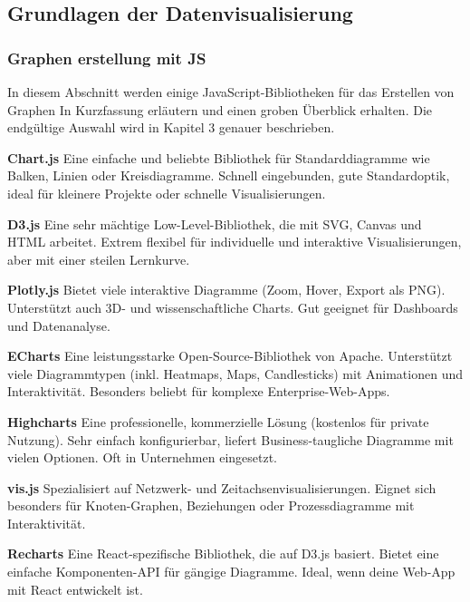 \subsection{Grundlagen der Datenvisualisierung}
\label{subsec:grundlagen-der-datenvisualisierung}

\subsubsection{Graphen erstellung mit JS}
In diesem Abschnitt werden einige JavaScript-Bibliotheken für das Erstellen von Graphen
In Kurzfassung erläutern und einen groben Überblick erhalten.
Die endgültige Auswahl wird in Kapitel 3 genauer beschrieben.

\textbf{Chart.js}
Eine einfache und beliebte Bibliothek für Standarddiagramme wie Balken, Linien
oder Kreisdiagramme. Schnell eingebunden, gute Standardoptik, ideal für
kleinere Projekte oder schnelle Visualisierungen.

\textbf{D3.js}
Eine sehr mächtige Low-Level-Bibliothek, die mit SVG, Canvas und HTML arbeitet.
Extrem flexibel für individuelle und interaktive Visualisierungen, aber mit
einer steilen Lernkurve.

\textbf{Plotly.js}
Bietet viele interaktive Diagramme (Zoom, Hover, Export als PNG). Unterstützt
auch 3D- und wissenschaftliche Charts. Gut geeignet für Dashboards und
Datenanalyse.

\textbf{ECharts}
Eine leistungsstarke Open-Source-Bibliothek von Apache. Unterstützt viele
Diagrammtypen (inkl. Heatmaps, Maps, Candlesticks) mit Animationen und
Interaktivität. Besonders beliebt für komplexe Enterprise-Web-Apps.

\textbf{Highcharts}
Eine professionelle, kommerzielle Lösung (kostenlos für private Nutzung). Sehr
einfach konfigurierbar, liefert Business-taugliche Diagramme mit vielen
Optionen. Oft in Unternehmen eingesetzt.

\textbf{vis.js}
Spezialisiert auf Netzwerk- und Zeitachsenvisualisierungen. Eignet sich
besonders für Knoten-Graphen, Beziehungen oder Prozessdiagramme mit
Interaktivität.

\textbf{Recharts}
Eine React-spezifische Bibliothek, die auf D3.js basiert.
Bietet eine einfache Komponenten-API für gängige Diagramme.
Ideal, wenn deine Web-App mit React entwickelt ist.


